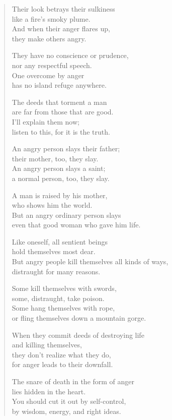 \documentclass[12pt,openany]{book}%
\begin{document}
\begin{verse}
Their look betrays their sulkiness \\
like a fire’s smoky plume. \\
And when their anger flares up, \\
they make others angry. 

They have no conscience or prudence, \\
nor any respectful speech. \\
One overcome by anger \\
has no island refuge anywhere. 

The deeds that torment a man \\
are far from those that are good. \\
I’ll explain them now; \\
listen to this, for it is the truth. 

An angry person slays their father; \\
their mother, too, they slay. \\
An angry person slays a saint; \\
a normal person, too, they slay. 

A man is raised by his mother, \\
who shows him the world. \\
But an angry ordinary person slays \\
even that good woman who gave him life. 

Like oneself, all sentient beings \\
hold themselves most dear. \\
But angry people kill themselves all kinds of ways, \\
distraught for many reasons. 

Some kill themselves with swords, \\
some, distraught, take poison. \\
Some hang themselves with rope, \\
or fling themselves down a mountain gorge. 

When they commit deeds of destroying life \\
and killing themselves, \\
they don’t realize what they do, \\
for anger leads to their downfall. 

The snare of death in the form of anger \\
lies hidden in the heart. \\
You should cut it out by self-control, \\
by wisdom, energy, and right ideas. 


\end{verse}
\end{document}
